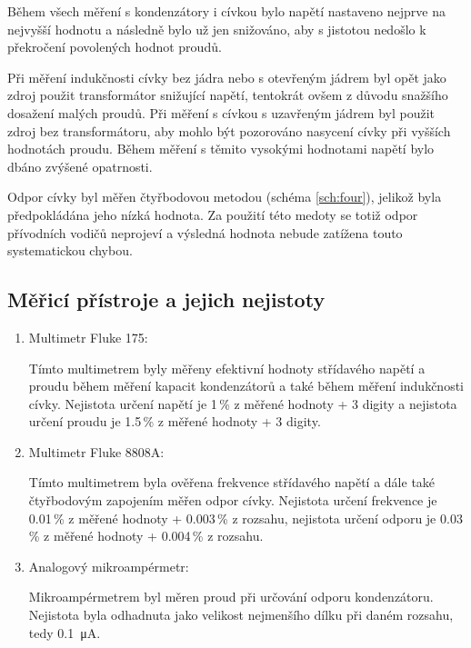 \documentclass{../concepts/prepareprotokol} %
\begin{document}
Během všech měření s kondenzátory i cívkou bylo napětí nastaveno nejprve na nejvyšší hodnotu a následně bylo už jen snižováno, aby s jistotou nedošlo k překročení povolených hodnot proudů.

Při měření indukčnosti cívky bez jádra nebo s otevřeným jádrem byl opět jako zdroj použit transformátor snižující napětí, tentokrát ovšem z důvodu snažšího dosažení malých proudů. Při měření s cívkou s uzavřeným jádrem byl použit zdroj bez transformátoru, aby mohlo být pozorováno nasycení cívky při vyšších hodnotách proudu. Během měření s těmito vysokými hodnotami napětí bylo dbáno zvýšené opatrnosti.

Odpor cívky byl měřen čtyřbodovou metodou (schéma \ref{sch:four}), jelikož byla předpokládána jeho nízká hodnota. Za použití této medoty se totiž odpor přívodních vodičů neprojeví a výsledná hodnota nebude zatížena touto systematickou chybou.

\subsection{Měřicí přístroje a jejich nejistoty} \label{pristroje}
\begin{enumerate}
    \item Multimetr Fluke 175:
    
    Tímto multimetrem byly měřeny efektivní hodnoty střídavého napětí a proudu během měření kapacit kondenzátorů a také během měření indukčnosti cívky. Nejistota určení napětí je 1\,\% z měřené hodnoty + 3 digity a nejistota určení proudu je 1.5\,\% z měřené hodnoty + 3 digity.

    \item Multimetr Fluke 8808A:

    Tímto multimetrem byla ověřena frekvence střídavého napětí a dále také čtyřbodovým zapojením měřen odpor cívky. Nejistota určení frekvence je 0.01\,\% z měřené hodnoty + 0.003\,\% z rozsahu, nejistota určení odporu je 0.03\,\% z měřené hodnoty + 0.004\,\% z rozsahu.

    \item Analogový mikroampérmetr:

    Mikroampérmetrem byl měren proud při určování odporu kondenzátoru. Nejistota byla odhadnuta jako velikost nejmenšího dílku při daném rozsahu, tedy \qty{0.1}{\micro\ampere}.

\end{enumerate}


\end{document}
